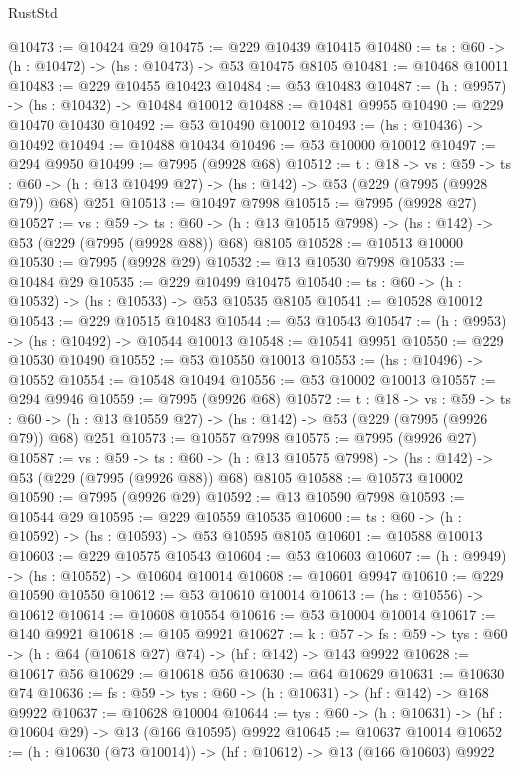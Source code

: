 \begin{lexlean}{RustStd}
\begin{coremodule}
@10473 := @10424 @29
@10475 := @229 @10439 @10415
@10480 := {ts : @60} -> (h : @10472) -> (hs : @10473) -> @53 @10475 @8105
@10481 := @10468 @10011
@10483 := @229 @10455 @10423
@10484 := @53 @10483
@10487 := (h : @9957) -> (hs : @10432) -> @10484 @10012
@10488 := @10481 @9955
@10490 := @229 @10470 @10430
@10492 := @53 @10490 @10012
@10493 := (hs : @10436) -> @10492
@10494 := @10488 @10434
@10496 := @53 @10000 @10012
@10497 := @294 @9950
@10499 := @7995 (@9928 @68)
@10512 := {t : @18} ->
  {vs : @59} ->
  {ts : @60} -> (h : @13 @10499 @27) -> (hs : @142) -> @53 (@229 (@7995 (@9928 @79)) @68) @251
@10513 := @10497 @7998
@10515 := @7995 (@9928 @27)
@10527 := {vs : @59} ->
  {ts : @60} -> (h : @13 @10515 @7998) -> (hs : @142) -> @53 (@229 (@7995 (@9928 @88)) @68) @8105
@10528 := @10513 @10000
@10530 := @7995 (@9928 @29)
@10532 := @13 @10530 @7998
@10533 := @10484 @29
@10535 := @229 @10499 @10475
@10540 := {ts : @60} -> (h : @10532) -> (hs : @10533) -> @53 @10535 @8105
@10541 := @10528 @10012
@10543 := @229 @10515 @10483
@10544 := @53 @10543
@10547 := (h : @9953) -> (hs : @10492) -> @10544 @10013
@10548 := @10541 @9951
@10550 := @229 @10530 @10490
@10552 := @53 @10550 @10013
@10553 := (hs : @10496) -> @10552
@10554 := @10548 @10494
@10556 := @53 @10002 @10013
@10557 := @294 @9946
@10559 := @7995 (@9926 @68)
@10572 := {t : @18} ->
  {vs : @59} ->
  {ts : @60} -> (h : @13 @10559 @27) -> (hs : @142) -> @53 (@229 (@7995 (@9926 @79)) @68) @251
@10573 := @10557 @7998
@10575 := @7995 (@9926 @27)
@10587 := {vs : @59} ->
  {ts : @60} -> (h : @13 @10575 @7998) -> (hs : @142) -> @53 (@229 (@7995 (@9926 @88)) @68) @8105
@10588 := @10573 @10002
@10590 := @7995 (@9926 @29)
@10592 := @13 @10590 @7998
@10593 := @10544 @29
@10595 := @229 @10559 @10535
@10600 := {ts : @60} -> (h : @10592) -> (hs : @10593) -> @53 @10595 @8105
@10601 := @10588 @10013
@10603 := @229 @10575 @10543
@10604 := @53 @10603
@10607 := (h : @9949) -> (hs : @10552) -> @10604 @10014
@10608 := @10601 @9947
@10610 := @229 @10590 @10550
@10612 := @53 @10610 @10014
@10613 := (hs : @10556) -> @10612
@10614 := @10608 @10554
@10616 := @53 @10004 @10014
@10617 := @140 @9921
@10618 := @105 @9921
@10627 := {k : @57} ->
  {fs : @59} -> {tys : @60} -> (h : @64 (@10618 @27) @74) -> (hf : @142) -> @143 @9922
@10628 := @10617 @56
@10629 := @10618 @56
@10630 := @64 @10629
@10631 := @10630 @74
@10636 := {fs : @59} -> {tys : @60} -> (h : @10631) -> (hf : @142) -> @168 @9922
@10637 := @10628 @10004
@10644 := {tys : @60} -> (h : @10631) -> (hf : @10604 @29) -> @13 (@166 @10595) @9922
@10645 := @10637 @10014
@10652 := (h : @10630 (@73 @10014)) -> (hf : @10612) -> @13 (@166 @10603) @9922

\end{coremodule}
\end{lexlean}
